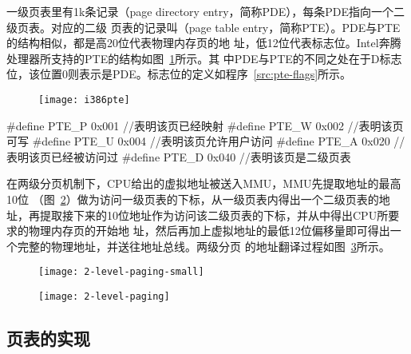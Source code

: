 \documentclass{swfcthesismscctex}
\begin{document}
一级页表里有1k条记录（page directory entry，简称PDE），每条PDE指向一个二级页表。对应的二级
页表的记录叫（page table entry，简称PTE）。PDE与PTE的结构相似，都是高20位代表物理内存页的地
址，低12位代表标志位。Intel奔腾处理器所支持的PTE的结构如图~\ref{fig:i386pte}所示。其
中PDE与PTE的不同之处在于D标志位，该位置0则表示是PDE。标志位的定义如程序~\ref{src:pte-flags}所示。

\begin{figure}[!ht]
  \centering
  \texttt{[image: i386pte]}
  \label{fig:i386pte}
\end{figure}

\begin{listing}%
  \begin{codeblock}
\begin{ccode}
#define PTE_P 0x001 //表明该页已经映射
#define PTE_W 0x002 //表明该页可写
#define PTE_U 0x004 //表明该页允许用户访问
#define PTE_A 0x020 //表明该页已经被访问过
#define PTE_D 0x040 //表明该页是二级页表
\end{ccode}
  \end{codeblock}
  \label{src:pte-flags}
\end{listing}

在两级分页机制下，CPU给出的虚拟地址被送入MMU，MMU先提取地址的最高10位
（图~\ref{fig:2levelpagingsmall}）做为访问一级页表的下标，从一级页表内得出一个二级页表的地
址，再提取接下来的10位地址作为访问该二级页表的下标，并从中得出CPU所要求的物理内存页的开始地
址，然后再加上虚拟地址的最低12位偏移量即可得出一个完整的物理地址，并送往地址总线。两级分页
的地址翻译过程如图~\ref{fig:2levelpaging}所示。

\begin{figure}[!ht]
  \centering
  \texttt{[image: 2-level-paging-small]}
  \label{fig:2levelpagingsmall}
\end{figure}

\begin{figure}[!ht]
  \centering
  \texttt{[image: 2-level-paging]}
  \label{fig:2levelpaging}
\end{figure}

\subsection{页表的实现}
\end{document}
